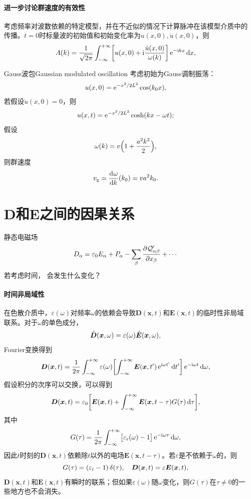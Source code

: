 \paragraph{进一步讨论群速度的有效性}

考虑频率对波数依赖的特定模型，并在不近似的情况下计算脉冲在该模型介质中的传播。$t=0$时标量波的初始值和初始变化率为$u(x,0),\dot u(x,0)$，则 
\[
    A(k)=\frac1{\sqrt{2\pi}}\int_{-\infty}^{+\infty}\biggl[u(x,0)+\mathrm{i}\frac{\dot u(x,0)}{\omega(k)}\biggr]\mathop{}\!\mathrm{e}^{-\mathrm{i} kx}\mathop{}\!\mathrm{d} x,
\]
\begin{example}{Gauss波包}{Gaussian modulated oscillation}
    考虑初始为Gauss调制振荡：
    \[
        u(x,0)=\mathop{}\!\mathrm{e}^{-x^2/2L^2}\cos(k_0x),
    \]
    若假设$\dot u(x,0)=0$，则
    \[
        u(x,t)=\mathop{}\!\mathrm{e}^{-x^2/2L^2}\cosh(kx-\omega t);
    \]
    \tcblower
    假设 
    \[
        \omega(k)=v\Bigl(1+\frac{a^2k^2}2\Bigr),
    \]
    则群速度
    \[
        v_\text g=\frac{\mathrm{d}^{{}}\omega}{\mathrm{d}{k}^{{}}}(k_0)=va^2k_0.
    \]
\end{example}

\section{\texorpdfstring{$\bm D$}{D}和\texorpdfstring{$\bm E$}{E}之间的因果关系}

静态电磁场
\[
    D_\alpha=\varepsilon_0E_\alpha+P_\alpha-\sum_\beta\frac{\partial^{{}}\mathcal Q'_{\alpha\beta}}{\partial{x_\beta}^{{}}}+\cdots
\]
若考虑时间，
会发生什么变化？

\paragraph{时间非局域性}

在色散介质中，$\varepsilon(\omega)$对频率$\omega$的依赖会导致$\bm D(\bm x,t)$和$\bm E(\bm x,t)$的临时性非局域联系。对于$\omega$的单色成分，
\[
    \hat{\bm{D}}(\bm x,\omega)=\varepsilon(\omega)\hat{\bm{E}}(\bm x,\omega),
\]
Fourier变换得到
\[
    \bm D(\bm x,t)=\frac1{2\pi}\int_{-\infty}^{+\infty}\varepsilon(\omega)\biggl[\int_{-\infty}^{+\infty}\bm E(\bm x,t')\mathop{}\!\mathrm{e}^{\mathrm{i}\omega t'}\mathop{}\!\mathrm{d} t'\biggr]\mathop{}\!\mathrm{e}^{-\mathrm{i}\omega t}\mathop{}\!\mathrm{d}\omega,
\]
假设积分的次序可以交换，可以得到
\begin{equation}
    \label{eqn:D-E with omega}
    \bm D(\bm x,t)=\varepsilon_0\biggl[\bm E(\bm x,t)+\int_{-\infty}^{+\infty}\bm E(\bm x,t-\tau)G(\tau)\mathop{}\!\mathrm{d}\tau\biggr],
\end{equation}
其中 
\[
    G(\tau)=\frac1{2\pi}\int_{-\infty}^{+\infty}\bigl[\varepsilon_\text r(\omega)-1\bigr]\mathop{}\!\mathrm{e}^{-\mathrm{i}\omega\tau}\mathop{}\!\mathrm{d}\omega,
\]
因此$t$时刻的$\bm D(\bm x,t)$依赖除$t$以外的电场$\bm E(\bm x,t-\tau)$。若$\varepsilon$是不依赖于$\omega$的，则 
\[
    G(\tau)=(\varepsilon_\text r-1)\mathop{}\!\delta(\tau),\quad\bm D(\bm x,t)=\varepsilon\bm E(\bm x,t),
\]
$\bm D(\bm x,t)$和$\bm E(\bm x,t)$有瞬时的联系；但如果$\varepsilon(\omega)$随$\omega$变化，则$G(\tau)$在$\tau\neq 0$的一些地方也不会消失。


